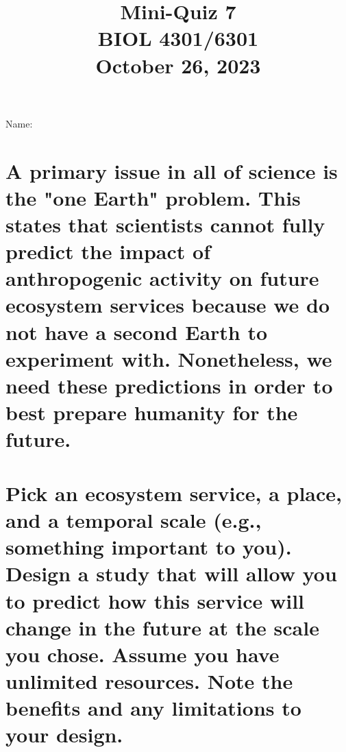 \documentclass[12pt, notitlepage]{article}   	%
\title{
	\textbf{
		Mini-Quiz 7
	} \\
	\large BIOL 4301/6301 \\
	\large October 26, 2023 \\
}
\date{\vspace{-5ex}}
\begin{document}
{\selectfont %

\large{Name:}

{\let\newpage\relax\maketitle}

\section{\small{A primary issue in all of science is the "one Earth" problem.
This states that scientists cannot fully predict the impact of anthropogenic activity
on future ecosystem services because we do not have a second Earth to experiment with.
Nonetheless, we need these predictions in order to best prepare humanity for the future.
\\
\\
Pick an ecosystem service, a place, and a temporal scale (e.g., something important to you). 
Design a study that will allow you to predict how this
service will change in the future at the scale you chose. Assume you have unlimited resources. 
Note the benefits and any limitations to your design.}}


} %
\end{document}
